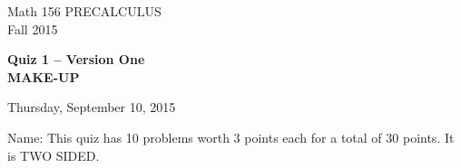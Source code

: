 \documentclass[11pt]{article}
\begin{document}
\begin{center}
\vspace{2in}

\huge{Math 156 PRECALCULUS \\
Fall 2015}

\vfill

\huge{\bf{Quiz 1 -- Version One}\\
MAKE-UP}\\

\vspace{0.5in}

\large{Thursday, September 10, 2015}\\

\vfill


{\huge{Name:{\underline{\hspace{2in}}}}}
\vfill
This quiz has 10 problems worth 3 points each for a total of 30 points. It is TWO SIDED. 
\vfill
\end{center}
\newpage
\restoregeometry
\end{document}
